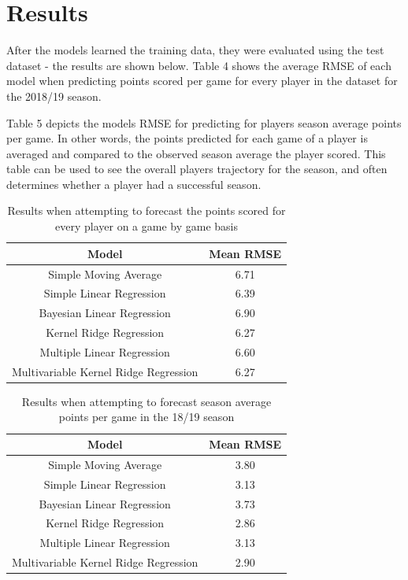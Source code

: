 \documentclass[a4paper,11pt,twoside]{article}
\begin{document}
\newpage

\section{Results}

After the models learned the training data, they were evaluated using the test dataset - the results are shown below. Table 4 shows the average RMSE of each model when predicting points scored per game for every player in the dataset for the 2018/19 season.

Table 5 depicts the models RMSE for predicting for players season average points per game. In other words, the points predicted for each game of a player is averaged and compared to the observed season average the player scored. This table can be used to see the overall players trajectory for the season, and often determines whether a player had a successful season.
\vspace{5mm}
\begin{table} [h!]
\captionsetup{justification=centering}
\begin{center}
\begin{tabular}{ |c|c|} 
 \hline
 \textbf{Model} & \textbf{Mean RMSE}\\ 
 \hline
 Simple Moving Average &  6.71\\ 
 \hline
 Simple Linear Regression &  6.39\\ 
 \hline
 Bayesian Linear Regression& 6.90\\
 \hline
 Kernel Ridge Regression& 6.27\\
 \hline
 Multiple Linear Regression& 6.60\\
 \hline
 Multivariable Kernel Ridge Regression & 6.27\\
 \hline
\end{tabular}
\end{center}
\caption{Results when attempting to forecast the points scored for every player on a game by game basis}
\end{table}

\begin{table}[h!]
\captionsetup{justification=centering}
\begin{center}
\begin{tabular}{ |c|c|} 
 \hline
     \textbf{Model} & \textbf{Mean RMSE}\\ 
 \hline
 Simple Moving Average  & 3.80\\ 
 \hline
 Simple Linear Regression & 3.13\\ 
 \hline
 Bayesian Linear Regression  & 3.73 \\
 \hline
 Kernel Ridge Regression  & 2.86\\
 \hline
 Multiple Linear Regression& 3.13\\
 \hline
 Multivariable Kernel Ridge Regression  & 2.90\\
 \hline
\end{tabular}
\end{center}
\caption{Results when attempting to forecast season average points per game in the 18/19 season}
\end{table}
\end{document}
